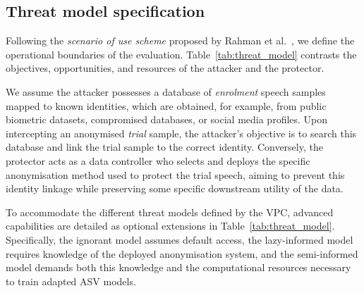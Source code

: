 \subsection{Threat model specification}

Following the \textit{scenario of use scheme} proposed by Rahman et al.~\cite{rahman2024scenario}, we define the operational boundaries of the evaluation. Table~\ref{tab:threat_model} contrasts the objectives, opportunities, and resources of the attacker and the protector. 

We assume the attacker possesses a database of \textit{enrolment} speech samples mapped to known identities, which are obtained, for example, from public biometric datasets, compromised databases, or social media profiles. Upon intercepting an anonymised \textit{trial} sample, the attacker's objective is to search this database and link the trial sample to the correct identity. Conversely, the protector acts as a data controller who selects and deploys the specific anonymisation method used to protect the trial speech, aiming to prevent this identity linkage while preserving some specific downstream utility of the data.

To accommodate the different threat models defined by the VPC, advanced capabilities are detailed as optional extensions in Table~\ref{tab:threat_model}. Specifically, the ignorant model assumes default access, the lazy-informed model requires knowledge of the deployed anonymisation system, and the semi-informed model demands both this knowledge and the computational resources necessary to train adapted ASV models.

